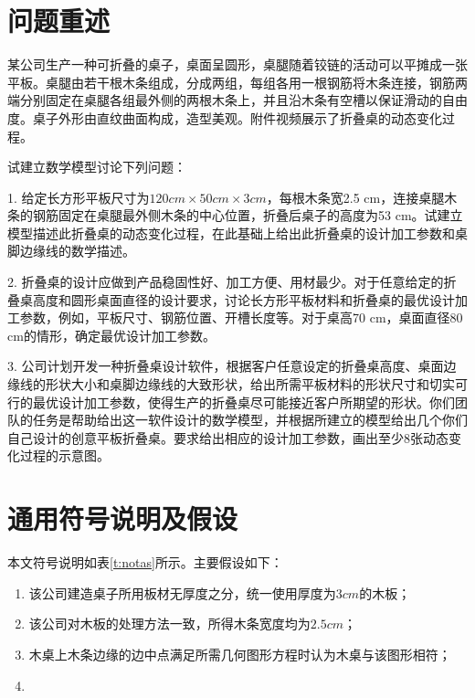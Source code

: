 \documentclass[12pt,a4paper]{article}
\begin{document}
\renewcommand{\contentsname}{目录}
\tableofcontents

\section{问题重述}
某公司生产一种可折叠的桌子，桌面呈圆形，桌腿随着铰链的活动可以平摊成一张平板。桌腿由若干根木条组成，分成两组，每组各用一根钢筋将木条连接，钢筋两端分别固定在桌腿各组最外侧的两根木条上，并且沿木条有空槽以保证滑动的自由度。桌子外形由直纹曲面构成，造型美观。附件视频展示了折叠桌的动态变化过程。\par
试建立数学模型讨论下列问题：\par
1. 给定长方形平板尺寸为$120 cm \times 50 cm \times 3 cm$，每根木条宽2.5 cm，连接桌腿木条的钢筋固定在桌腿最外侧木条的中心位置，折叠后桌子的高度为53 cm。试建立模型描述此折叠桌的动态变化过程，在此基础上给出此折叠桌的设计加工参数和桌脚边缘线的数学描述。\par
2. 折叠桌的设计应做到产品稳固性好、加工方便、用材最少。对于任意给定的折叠桌高度和圆形桌面直径的设计要求，讨论长方形平板材料和折叠桌的最优设计加工参数，例如，平板尺寸、钢筋位置、开槽长度等。对于桌高70 cm，桌面直径80 cm的情形，确定最优设计加工参数。\par
3. 公司计划开发一种折叠桌设计软件，根据客户任意设定的折叠桌高度、桌面边缘线的形状大小和桌脚边缘线的大致形状，给出所需平板材料的形状尺寸和切实可行的最优设计加工参数，使得生产的折叠桌尽可能接近客户所期望的形状。你们团队的任务是帮助给出这一软件设计的数学模型，并根据所建立的模型给出几个你们自己设计的创意平板折叠桌。要求给出相应的设计加工参数，画出至少8张动态变化过程的示意图。\par
\cite{qiyuan03}
\cite{guangzhou12}
\cite{guangzhou09}


\section{通用符号说明及假设}
本文符号说明如表\ref{t:notas}所示。主要假设如下：
\begin{enumerate}
\item 该公司建造桌子所用板材无厚度之分，统一使用厚度为$3cm$的木板；
\item 该公司对木板的处理方法一致，所得木条宽度均为$2.5cm$；
\item 木桌上木条边缘的边中点满足所需几何图形方程时认为木桌与该图形相符；
\item 
\end{enumerate}
\end{document}
